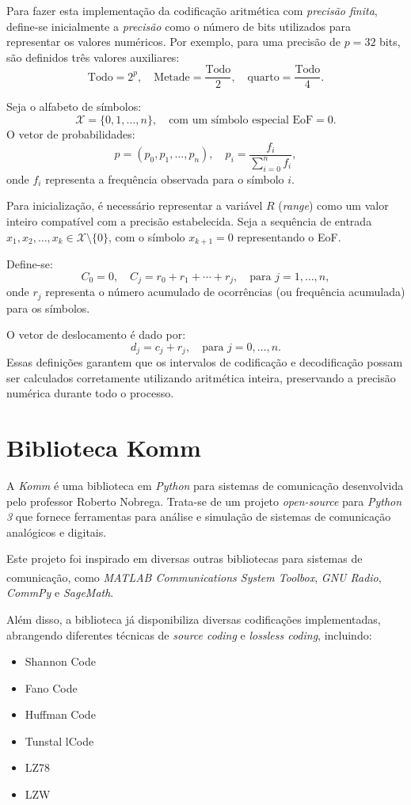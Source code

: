 Para fazer esta implementação da codificação aritmética com \textit{precisão finita}, define-se inicialmente a \textit{precisão} como o número de bits utilizados para representar os valores numéricos. Por exemplo, para uma precisão de \(p = 32\) bits, são definidos três valores auxiliares:
\[
\text{Todo} = 2^{p}, \quad \text{Metade} = \frac{\text{Todo}}{2}, \quad \text{quarto} = \frac{\text{Todo}}{4}.
\]

Seja o alfabeto de símbolos:
\[
\mathcal{X} = \{ 0, 1, \ldots, n \}, \quad \text{com um símbolo especial EoF} = 0.
\]
O vetor de probabilidades:
\[
p = (p_0, p_1, \ldots, p_n), \quad p_i = \frac{f_i}{\sum_{i=0}^{n} f_i},
\]
onde \(f_i\) representa a frequência observada para o símbolo \(i\).

Para inicialização, é necessário representar a variável \(R\) (\textit{range}) como um valor inteiro compatível com a precisão estabelecida.  
Seja a sequência de entrada \(x_1, x_2, \ldots, x_k \in \mathcal{X} \setminus \{ 0 \}\), com o símbolo \(x_{k+1} = 0\) representando o EoF.

Define-se:
\[
C_0 = 0, \quad C_j = r_0 + r_1 + \cdots + r_j, \quad \text{para } j = 1, \ldots, n,
\]
onde \(r_j\) representa o número acumulado de ocorrências (ou frequência acumulada) para os símbolos.

O vetor de deslocamento é dado por:
\[
d_j = c_j + r_j, \quad \text{para } j = 0, \ldots, n.
\]
Essas definições garantem que os intervalos de codificação e decodificação possam ser calculados corretamente utilizando aritmética inteira, preservando a precisão numérica durante todo o processo.


\newpage
\section{Biblioteca Komm}
A \textit{Komm} é uma biblioteca em \textit{Python} para sistemas de comunicação desenvolvida pelo professor Roberto Nobrega.  
Trata-se de um projeto \textit{open-source} para \textit{Python 3} que fornece ferramentas para análise e simulação de sistemas de comunicação analógicos e digitais.  

Este projeto foi inspirado em diversas outras bibliotecas para sistemas de comunicação, como \textit{MATLAB\textsuperscript{\textregistered} Communications System Toolbox\texttrademark}, \textit{GNU Radio}, \textit{CommPy} e \textit{SageMath}.  

Além disso, a biblioteca já disponibiliza diversas codificações implementadas, abrangendo diferentes técnicas de \textit{source coding} e \textit{lossless coding}, incluindo:  
\begin{itemize}
    \item {Shannon Code}
    \item {Fano Code}
    \item {Huffman Code}
    \item {Tunstal lCode}
    \item {LZ78}
    \item {LZW}
\end{itemize}
